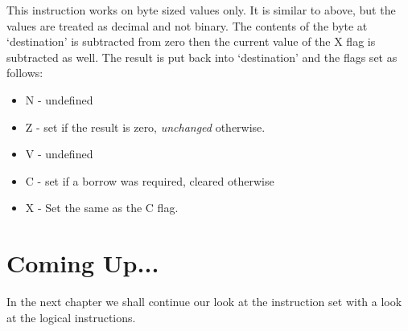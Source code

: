 This instruction works on byte sized values only. It is similar to
       above, but the values are treated as decimal and not binary. The
      contents of the byte at `destination' is subtracted from zero then the
      current value of the X flag is subtracted as well. The result is put
      back into `destination' and the flags set as follows:
\begin{itemize}[itemsep=0pt]

\item{}N -{} undefined


\item{}Z -{} set if the result is zero, \emph{unchanged} otherwise.


\item{}V -{} undefined


\item{}C -{} set if a borrow was required, cleared otherwise


\item{}X -{} Set the same as the C flag.

\end{itemize}

\section{Coming Up...}
\label{ch3-the-end}%

In the next chapter we shall continue our look at the instruction
    set with a look at the logical instructions.

